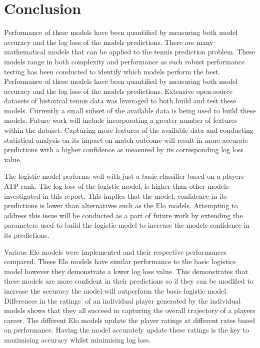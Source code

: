 \documentclass[12pt,a4paper]{article}
\begin{document}
\section{Conclusion}
Performance of these models have been quantified by measuring both
model accuracy and the log loss of the models predictions. There are many mathematical models that can be applied to the tennis prediction problem.
These models range in both complexity and performance as such robust performance testing
has been conducted to identify which models perform the best. Performance of these models
have been quantified by measuring both model accuracy and the log loss of the models
predictions. Extensive open-source datasets of historical tennis data was leveraged to
both build and test these models. Currently a small subset of the available data is being
used to build these models. Future work will include incorporating a greater number of
features within the dataset. Capturing more features of the available data and conducting
statistical analysis on its impact on match outcome will result in more accurate predictions
with a higher confidence as measured by its corresponding log loss value.

The logistic model performs well with just a basic classifier based on a
players ATP rank. The log loss of the logistic model, is higher than other models
investigated in this report. This implies that the model,
confidence in its predictions is lower than alternatives such as the Elo models.
Attempting to address this issue will be conducted as a part of future work by
extending the parameters used to build the logistic model to increase the models
confidence in its predictions.

Various Elo models were implemented and their respective performances compared. These Elo
models have similar performance to the basic logistics model however they demonstrate a
lower log loss value. This demonstrates that these models are more confident in their
predictions so if they can be modified to increase the accuracy the model will outperform
the basic logistic model. Differences in the ratings' of an individual player
generated by the individual models shows that they all succeed in capturing the overall
trajectory of a players career. The different Elo models update the player ratings at
different rates based on performance. Having the model accurately update these ratings
is the key to maximising accuracy whilst minimising log loss.

\clearpage




\vspace{10mm}
\noindent \hrulefill
\end{document}
